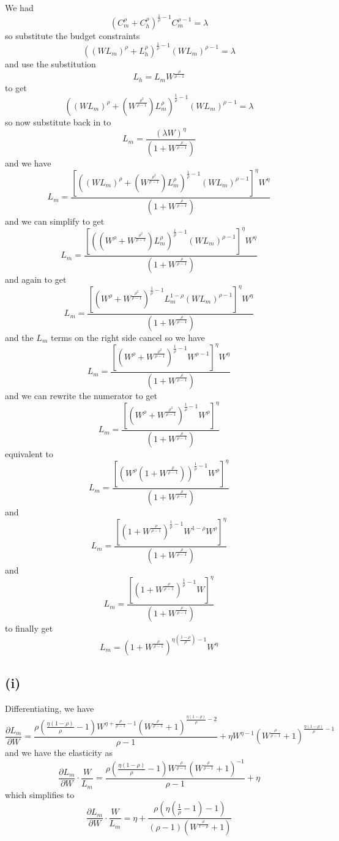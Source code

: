 \documentclass[11pt]{amsart}
\begin{document}
We had
\[
\left( C_m^\rho + C_h^\rho \right)^{\frac{1}{\rho} -1}  C_m^{\rho-1} = \lambda
\]
so substitute the budget constraints
\[
((W L_m)^{\rho} + L_h^{\rho})^{\frac{1}{\rho} -1} (W L_m)^{\rho-1} = \lambda
\]
and use the substitution
\[
L_h = L_m W^{\frac{\rho}{\rho-1}}
\]
to get
\[
((W L_m)^{\rho} + ( W^{\frac{\rho^2}{\rho-1}}) L_m^{\rho})^{\frac{1}{\rho} -1} (W L_m)^{\rho-1} = \lambda
\]
so now substitute back in to
\[
L_m = \frac{(\lambda W)^{\eta}}{(1 + W^{\frac{\rho}{\rho-1}})}
\]
and we have
\[
L_m = \frac{ \left[((W L_m)^{\rho} + ( W^{\frac{\rho^2}{\rho-1}}) L_m^{\rho})^{\frac{1}{\rho} -1} (W L_m)^{\rho-1}\right]^{\eta} W^{\eta}}{(1 + W^{\frac{\rho}{\rho-1}})}
\]
and we can simplify to get
\[
L_m = \frac{ \left[((W^{\rho} + W^{\frac{\rho^2}{\rho-1}}) L_m^{\rho})^{\frac{1}{\rho} -1} (W L_m)^{\rho-1}\right]^{\eta} W^{\eta}}{(1 + W^{\frac{\rho}{\rho-1}})}
\]
and again to get
\[
L_m = \frac{ \left[(W^{\rho} + W^{\frac{\rho^2}{\rho-1}})^{\frac{1}{\rho} -1} L_m^{1-\rho} (W L_m)^{\rho-1}\right]^{\eta} W^{\eta}}{(1 + W^{\frac{\rho}{\rho-1}})}
\]
and the $L_m$ terms on the right side cancel so we have
\[
L_m = \frac{ \left[(W^{\rho} + W^{\frac{\rho^2}{\rho-1}})^{\frac{1}{\rho} -1}  W ^{\rho-1}\right]^{\eta} W^{\eta}}{(1 + W^{\frac{\rho}{\rho-1}})}
\]
and we can rewrite the numerator to get
\[
L_m = \frac{ \left[(W^{\rho} + W^{\frac{\rho^2}{\rho-1}})^{\frac{1}{\rho} -1}  W ^{\rho}\right]^{\eta} }{(1 + W^{\frac{\rho}{\rho-1}})}
\] 
equivalent to 
\[
L_m = \frac{ \left[(W^{\rho}(1 + W^{\frac{\rho}{\rho-1}}))^{\frac{1}{\rho} -1}  W ^{\rho}\right]^{\eta} }{(1 + W^{\frac{\rho}{\rho-1}})}
\] 
and
\[
L_m = \frac{ \left[(1 + W^{\frac{\rho}{\rho-1}})^{\frac{1}{\rho} -1}  W^{1-\rho} W ^{\rho}\right]^{\eta} }{(1 + W^{\frac{\rho}{\rho-1}})}
\] 
and
\[
L_m = \frac{ \left[(1 + W^{\frac{\rho}{\rho-1}})^{\frac{1}{\rho} -1}  W \right]^{\eta} }{(1 + W^{\frac{\rho}{\rho-1}})}
\] 
to finally get
\[
L_m = \left( 1 + W^{\frac{\rho}{\rho-1}} \right)^{\eta \left( \frac{1-\rho}{\rho} \right) -1} W^\eta
\]

\subsection*{(i)}

Differentiating, we have
\[
\frac{\partial L_m}{\partial W} = \frac{\rho  \left(\frac{\eta  (1-\rho )}{\rho }-1\right) W^{\eta +\frac{\rho }{\rho -1}-1} \left(W^{\frac{\rho }{\rho -1}}+1\right)^{\frac{\eta  (1-\rho )}{\rho }-2}}{\rho -1}+\eta  W^{\eta -1} \left(W^{\frac{\rho }{\rho -1}}+1\right)^{\frac{\eta  (1-\rho )}{\rho }-1}
\]
and we have the elasticity as
\[
\frac{\partial L_m}{\partial W} \cdot \frac{W}{ L_m} = \frac{\rho  \left(\frac{\eta  (1-\rho )}{\rho }-1\right) W^{\frac{\rho }{\rho -1}} \left(W^{\frac{\rho }{\rho -1}}+1\right)^{-1}}{\rho -1} + \eta 
\]
which simplifies to 
\[
\frac{\partial L_m}{\partial W} \cdot \frac{W}{ L_m} =  \eta +\frac{\rho  \left(\eta  \left(\frac{1}{\rho }-1\right)-1\right)}{(\rho -1) \left(W^{\frac{\rho }{1-\rho }}+1\right)}
\]
\end{document}
